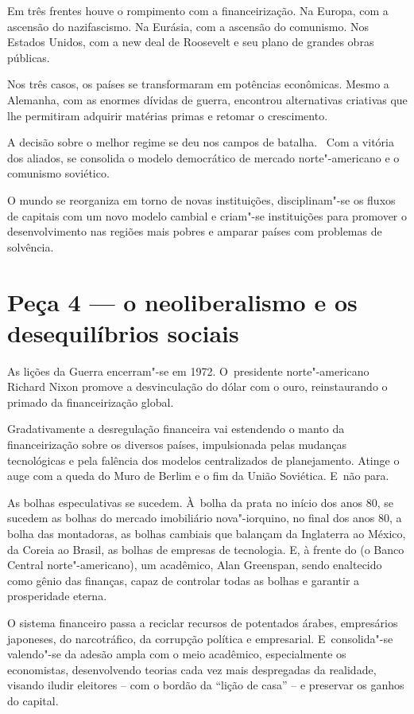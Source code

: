 Em três frentes houve o rompimento com a financeirização. Na Europa, com
a ascensão do nazifascismo. Na Eurásia, com a ascensão do comunismo. Nos
Estados Unidos, com a new deal de Roosevelt e seu plano de grandes obras
públicas.

Nos três casos, os países se transformaram em potências econômicas.
Mesmo a Alemanha, com as enormes dívidas de guerra, encontrou
alternativas criativas que lhe permitiram adquirir matérias primas e
retomar o crescimento.

A decisão sobre o melhor regime se deu nos campos de batalha. ~Com a
vitória dos aliados, se consolida o modelo democrático de mercado
norte"-americano e o comunismo soviético.

O mundo se reorganiza em torno de novas instituições, disciplinam"-se os
fluxos de capitais com um novo modelo cambial e criam"-se instituições
para promover o desenvolvimento nas regiões mais pobres e amparar países
com problemas de solvência.

\section{Peça 4 --- o neoliberalismo e os desequilíbrios sociais}

As lições da Guerra encerram"-se em 1972. O~presidente norte"-americano
Richard Nixon promove a desvinculação do dólar com o ouro, reinstaurando
o primado da financeirização global.

Gradativamente a desregulação financeira vai estendendo o manto da
financeirização sobre os diversos países, impulsionada pelas mudanças
tecnológicas e pela falência dos modelos centralizados de planejamento.
Atinge o auge com a queda do Muro de Berlim e o fim da União Soviética.
E~não para.

As bolhas especulativas se sucedem. À~bolha da prata no início dos anos
80, se sucedem as bolhas do mercado imobiliário nova"-iorquino, no final
dos anos 80, a bolha das montadoras, as bolhas cambiais que balançam da
Inglaterra ao México, da Coreia ao Brasil, as bolhas de empresas de
tecnologia. E, à frente do  (o Banco Central norte"-americano), um
acadêmico, Alan Greenspan, sendo enaltecido como gênio das finanças,
capaz de controlar todas as bolhas e garantir a prosperidade eterna.

O sistema financeiro passa a reciclar recursos de potentados árabes,
empresários japoneses, do narcotráfico, da corrupção política e
empresarial. E~consolida"-se valendo"-se da adesão ampla com o meio
acadêmico, especialmente os economistas, desenvolvendo teorias cada vez
mais despregadas da realidade, visando iludir eleitores -- com o bordão
da ``lição de casa'' -- e preservar os ganhos do capital.

